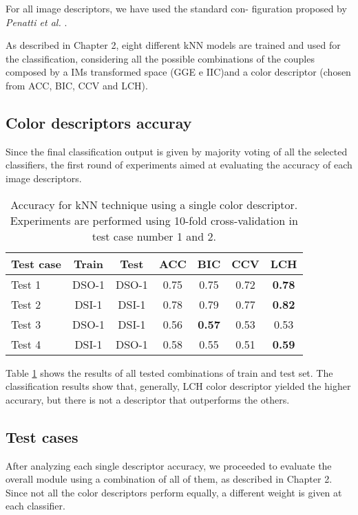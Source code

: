 For all image descriptors, we have used the standard con- figuration proposed by \emph{Penatti et al.} \cite{penatti2012comparative}.

As described in Chapter 2, eight different kNN models are trained and used for the classification, considering all the possible combinations of the couples composed by a IMs transformed space (GGE e IIC)and a color descriptor (chosen from ACC, BIC, CCV and LCH).

\subsection{Color descriptors accuray}

Since the final classification output is given by majority voting of all the selected classifiers, the first round of experiments aimed at evaluating the accuracy of each image descriptors.

\begin{table}[h!]
\centering
\begin{tabular}{l c c c c c c} 
\hline \hline 
\textbf{Test case} & \textbf{Train} & \textbf{Test} & \textbf{ACC} & \textbf{BIC} & \textbf{CCV} & \textbf{LCH} \\ [0.5ex]
\hline
Test 1 & DSO-1 & DSO-1 &	0.75 & 0.75	& 0.72 & \textbf{0.78}\\
Test 2 & DSI-1 & DSI-1 &	0.78 & 0.79 & 0.77 & \textbf{0.82}\\
Test 3 &	DSO-1 &	DSI-1 &	0.56 & \textbf{0.57} & 0.53 & 0.53\\
Test 4 &	DSI-1 & DSO-1 & 0.58 & 0.55 & 0.51 & \textbf{0.59}\\ [1ex]
\hline
\end{tabular}
\caption{Accuracy for kNN technique using a single color descriptor. Experiments are performed using 10-fold cross-validation in test case number 1 and 2.}
\label{table:colordescriptorperformance}
\end{table}

Table \ref{table:colordescriptorperformance} shows the results of all tested combinations of train and test set. The classification results show that, generally, LCH color descriptor yielded the higher accurary, but there is not a descriptor that outperforms the others.

\subsection{Test cases}

After analyzing each single descriptor accuracy, we proceeded to evaluate the overall module using a combination of all of them, as described in Chapter 2. Since not all the color descriptors perform equally, a different weight is given at each classifier.


